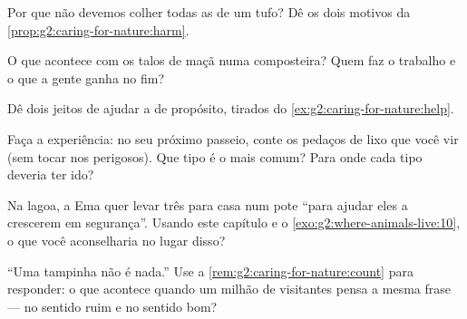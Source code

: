 \begin{exercise}[$\star$]\label{exo:g2:caring-for-nature:5}
Por que não devemos colher todas as  de um tufo? Dê os dois
motivos da \cref{prop:g2:caring-for-nature:harm}.
\end{exercise}

\begin{exercise}[$\star$]\label{exo:g2:caring-for-nature:6}
O que acontece com os talos de maçã numa composteira? Quem faz o
trabalho e o que a gente ganha no fim?
\end{exercise}

\begin{exercise}[$\star$]\label{exo:g2:caring-for-nature:7}
Dê dois jeitos de ajudar a  de propósito, tirados do
\cref{ex:g2:caring-for-nature:help}.
\end{exercise}

\begin{exercise}[$\star$]\label{exo:g2:caring-for-nature:8}
Faça a experiência: no seu próximo passeio, conte os pedaços de lixo
que você vir (sem tocar nos perigosos). Que tipo é o mais comum?
Para onde cada tipo deveria ter ido?
\end{exercise}

\begin{exercise}[$\star\star$]\label{exo:g2:caring-for-nature:9}
Na lagoa, a Ema quer levar três  para casa num pote ``para
ajudar eles a crescerem em segurança''. Usando este capítulo e o
\cref{exo:g2:where-animals-live:10}, o que você aconselharia no
lugar disso?
\end{exercise}

\begin{exercise}[$\star\star$]\label{exo:g2:caring-for-nature:10}
``Uma tampinha não é nada.'' Use a
\cref{rem:g2:caring-for-nature:count} para responder: o que
acontece quando um milhão de visitantes pensa a mesma frase --- no
sentido ruim e no sentido bom?
\end{exercise}
